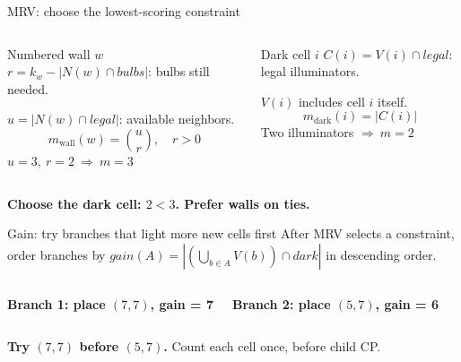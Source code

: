 \begin{frame}{MRV: choose the lowest-scoring constraint}
\begin{columns}[T,onlytextwidth]
\begin{block}{Numbered wall $w$}
\small $r=k_w-|N(w)\cap bulbs|$: bulbs still needed.\par
$u=|N(w)\cap legal|$: available neighbors.
\[
 m_{\mathrm{wall}}(w)=\binom{u}{r},\quad r>0
\]
\centering $u=3,\ r=2\ \Rightarrow\ \boxed{m=3}$
\end{block}
\begin{block}{Dark cell $i$}
\small $C(i)=V(i)\cap legal$: legal illuminators.\par
$V(i)$ includes cell $i$ itself.
\[
 m_{\mathrm{dark}}(i)=|C(i)|
\]
\centering Two illuminators $\Rightarrow\ \boxed{m=2}$
\end{block}
\end{columns}
\vspace{2mm}\centering
\textbf{Choose the dark cell: $2<3$. Prefer walls on ties.}
\end{frame}

\begin{frame}{Gain: try branches that light more new cells first}
\small After MRV selects a constraint, order branches by
$gain(A)=|(\bigcup_{b\in A}V(b))\cap dark|$ in descending order.
\begin{columns}[T,onlytextwidth]
\centering
\textbf{Branch 1: place $(7,7)$, gain = 7}\par\vspace{1mm}

\centering
\textbf{Branch 2: place $(5,7)$, gain = 6}\par\vspace{1mm}

\end{columns}
\par{}
\small\textbf{Try $(7,7)$ before $(5,7)$.} Count each cell once, before child CP.
\end{frame}

